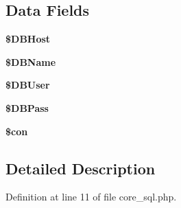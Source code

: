 \subsection*{Data Fields}
\begin{DoxyCompactItemize}
\item 
\hypertarget{classmysql_a1a881c28f710232dbf702d93c6a6e865}{{\bfseries \$\-D\-B\-Host}}\label{classmysql_a1a881c28f710232dbf702d93c6a6e865}

\item 
\hypertarget{classmysql_a3748d4d771a26c5411f1666a3a7a3cd8}{{\bfseries \$\-D\-B\-Name}}\label{classmysql_a3748d4d771a26c5411f1666a3a7a3cd8}

\item 
\hypertarget{classmysql_af107a7d38167b4ff8f65b395d856f7ab}{{\bfseries \$\-D\-B\-User}}\label{classmysql_af107a7d38167b4ff8f65b395d856f7ab}

\item 
\hypertarget{classmysql_a8cf3718595a762c1974c4adfa331bc58}{{\bfseries \$\-D\-B\-Pass}}\label{classmysql_a8cf3718595a762c1974c4adfa331bc58}

\item 
\hypertarget{classmysql_a0debe10448ec56a57b5509648408a549}{{\bfseries \$con}}\label{classmysql_a0debe10448ec56a57b5509648408a549}

\end{DoxyCompactItemize}


\subsection{Detailed Description}


Definition at line 11 of file core\-\_\-sql.\-php.



